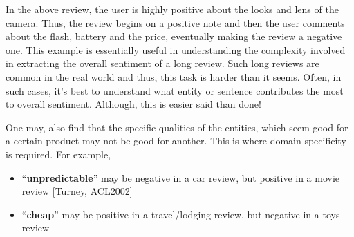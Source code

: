 In the above review, the user is highly positive about the looks and lens of the camera. Thus, the review begins on a positive note and then the user comments about the flash, battery and the price, eventually making the review a negative one. This example is essentially useful in understanding the complexity involved in extracting the overall sentiment of a long review. Such long reviews are common in the real world and thus, this task is harder than it seems. Often, in such cases, it's best to understand what entity or sentence contributes the most to overall sentiment. Although, this is easier said than done! 

One may, also find that the specific qualities of the entities, which seem good for a certain product may not be good for another. This is where domain specificity is required. For example,
\begin{itemize}
\item  “\textbf{unpredictable}” may be negative in a car review, but positive in a movie review [Turney, ACL2002]
\item “\textbf{cheap}” may be positive in a travel/lodging review, but negative in a toys review
\end{itemize}

   